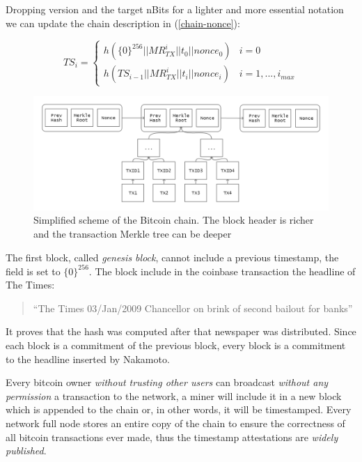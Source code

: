 Dropping version and the target nBits for a lighter and more essential notation we can update the chain description in (\ref{chain-nonce}):

\begin{equation}
TS_i =  
\begin{cases} 
h(\{0\}^{256}||MR_{TX}^i||t_0||nonce_0) & i=0\\ 
h(TS_{i-1}||MR_{TX}^i||t_i||nonce_i) & i=1, ..., i_{max} 
\end{cases}
\end{equation}

\begin{figure}
	\begin{center}
		\includegraphics[width=\linewidth]{Images/bitcoin-chain-tx.png}
		\caption[Simplified scheme of the Bitcoin chain]{Simplified scheme of the Bitcoin chain. The block header is richer and the transaction Merkle tree can be deeper}
		\label{fig:tx-chain}
	\end{center}
\end{figure}

The first block, called \textit{genesis block}, cannot include a previous timestamp, the field is set to $\{0\}^{256}$. The block include in the coinbase transaction the headline of The Times:
\begin{quotation}
\textquotedblleft The Times 03/Jan/2009 Chancellor on brink of second bailout for banks\textquotedblright 
\end{quotation}
It proves that the hash was computed after that newspaper was distributed. 
Since each block is a commitment of the previous block, every block is a commitment to the headline inserted by Nakamoto.

Every bitcoin owner \textit{without trusting other users} can broadcast \textit{without any permission} a transaction to the network, a miner will include it in a new block which is appended to the chain or, in other words, it will be timestamped. Every network full node stores an entire copy of the chain to ensure the correctness of all bitcoin transactions ever made, thus the timestamp attestations are \textit{widely published}.  

